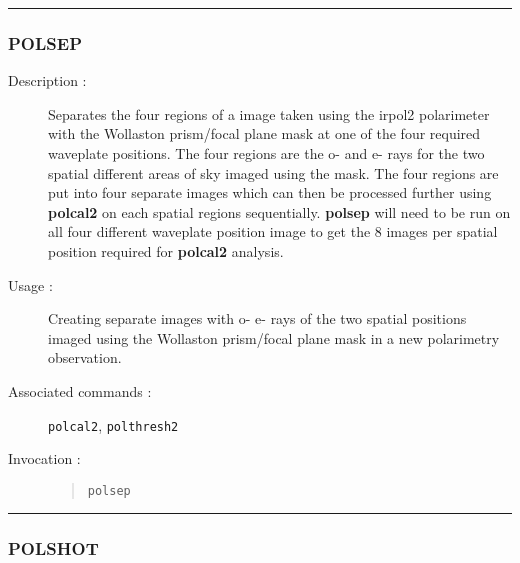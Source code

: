 \hrule 
\subsubsection*{\label{POLSEP}POLSEP}

\begin{description}

\item[Description :] Separates the four regions of a image taken using
the {\sc irpol2} polarimeter with the Wollaston prism/focal plane mask at one
of the four required waveplate positions.  The four regions are the o-
and e- rays for the two spatial different areas of sky imaged using the
mask.  The four regions are put into four separate images which can
then be processed further using {\bf polcal2} on each spatial regions
sequentially. {\bf polsep} will need to be run on all four different
waveplate position image to get the 8 images per spatial position
required for {\bf polcal2} analysis.

\item[Usage :] Creating separate images with o- e- rays of the two
spatial positions imaged using the Wollaston prism/focal plane mask in
a new polarimetry observation.

\item[Associated commands :] {\tt {}}
{\tt polcal2}, {\tt polthresh2}

\item[Invocation :]

\begin{quote}{\tt  polsep }\end{quote}

\end{description}

\hrule 
\subsubsection*{\label{POLSHOT}POLSHOT}

